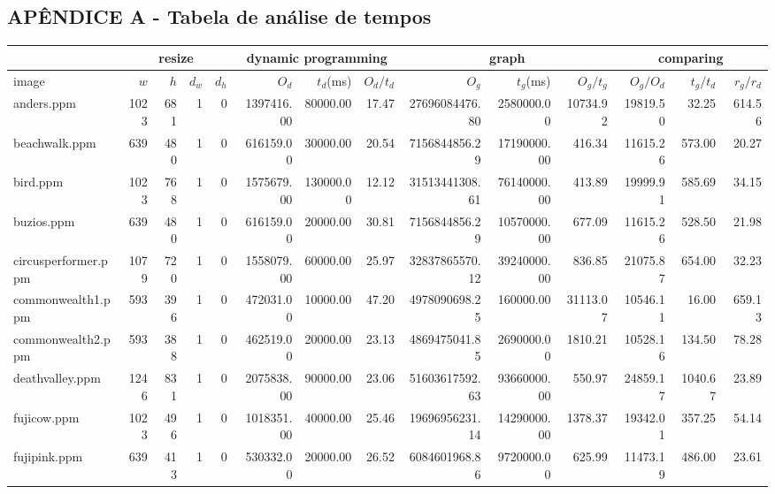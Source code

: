 \begin{landscape}

\section*{APÊNDICE A - Tabela de análise de tempos}
\label{appendix-a}

\scriptsize
\begin{tabular}{|l||r|r|r|r||r|r|r||r|r|r||r|r|r|}
\hline
&
\multicolumn{4}{|c||}{resize} & 
\multicolumn{3}{|c||}{dynamic programming} &
\multicolumn{3}{|c||}{graph} &
\multicolumn{3}{|c|}{comparing}\\
\hline
image & $w$ & $h$ & $d_w$ & $d_h$ & 
$O_d$ & $t_d$(ms) & $O_d/t_d$ & 
$O_g$ & $t_g$(ms) & $O_g/t_g$ &
$O_g/O_d$ & $t_g/t_d$ & $r_g/r_d$ \\
\hline
anders.ppm & 1023 & 681 & 1 & 0 & 1397416.00 & 80000.00 & 17.47 & 27696084476.80 & 2580000.00 & 10734.92 & 19819.50 & 32.25 & 614.56 \\
beachwalk.ppm & 639 & 480 & 1 & 0 & 616159.00 & 30000.00 & 20.54 & 7156844856.29 & 17190000.00 & 416.34 & 11615.26 & 573.00 & 20.27 \\
bird.ppm & 1023 & 768 & 1 & 0 & 1575679.00 & 130000.00 & 12.12 & 31513441308.61 & 76140000.00 & 413.89 & 19999.91 & 585.69 & 34.15 \\
buzios.ppm & 639 & 480 & 1 & 0 & 616159.00 & 20000.00 & 30.81 & 7156844856.29 & 10570000.00 & 677.09 & 11615.26 & 528.50 & 21.98 \\
circusperformer.ppm & 1079 & 720 & 1 & 0 & 1558079.00 & 60000.00 & 25.97 & 32837865570.12 & 39240000.00 & 836.85 & 21075.87 & 654.00 & 32.23 \\
commonwealth1.ppm & 593 & 396 & 1 & 0 & 472031.00 & 10000.00 & 47.20 & 4978090698.25 & 160000.00 & 31113.07 & 10546.11 & 16.00 & 659.13 \\
commonwealth2.ppm & 593 & 388 & 1 & 0 & 462519.00 & 20000.00 & 23.13 & 4869475041.85 & 2690000.00 & 1810.21 & 10528.16 & 134.50 & 78.28 \\
deathvalley.ppm & 1246 & 831 & 1 & 0 & 2075838.00 & 90000.00 & 23.06 & 51603617592.63 & 93660000.00 & 550.97 & 24859.17 & 1040.67 & 23.89 \\
fujicow.ppm & 1023 & 496 & 1 & 0 & 1018351.00 & 40000.00 & 25.46 & 19696956231.14 & 14290000.00 & 1378.37 & 19342.01 & 357.25 & 54.14 \\
fujipink.ppm & 639 & 413 & 1 & 0 & 530332.00 & 20000.00 & 26.52 & 6084601968.86 & 9720000.00 & 625.99 & 11473.19 & 486.00 & 23.61 \\

\end{tabular}
\end{landscape}
